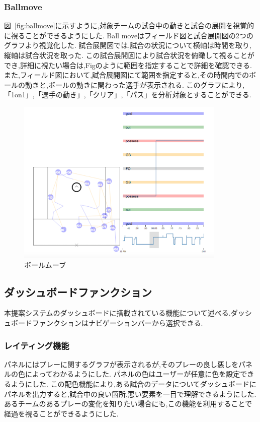 \documentclass[sotsuron]{kuee}
\begin{document}
			\subsubsection{Ballmove}
				図~\ref{fig:ballmove}に示すように,対象チームの試合中の動きと試合の展開を視覚的に視ることができるようにした.
				Ball moveはフィールド図と試合展開図の2つのグラフより視覚化した.
				試合展開図では,試合の状況について横軸は時間を取り,縦軸は試合状況を取った.
				この試合展開図により試合状況を俯瞰して視ることができ,詳細に視たい場合は,Figのように範囲を指定することで詳細を確認できる.
				また,フィールド図において,試合展開図にて範囲を指定すると,その時間内でのボールの動きと,ボールの動きに関わった選手が表示される.
				このグラフにより,「1on1」,「選手の動き」,「クリア」,「パス」を分析対象とすることができる.
					\begin{figure}
						\begin{center}
							\includegraphics[width=10cm]{./png/ballmove.png}
						\end{center}
						\caption{ボールムーブ}
				  		\label{fig:basllmove}
					\end{figure}
		\subsection{ダッシュボードファンクション}
			本提案システムのダッシュボードに搭載されている機能について述べる.ダッシュボードファンクションはナビゲーションバーから選択できる.
			\subsubsection{レイティング機能}
			パネルにはプレーに関するグラフが表示されるが,そのプレーの良し悪しをパネルの色によってわかるようにした.
			パネルの色はユーザーが任意に色を設定できるようにした.
			この配色機能により,ある試合のデータについてダッシュボードにパネルを出力すると,試合中の良い箇所,悪い要素を一目で理解できるようにした.
			あるチームのあるプレーの変化を知りたい場合にも,この機能を利用することで経過を視ることができるようにした.
\end{document}
